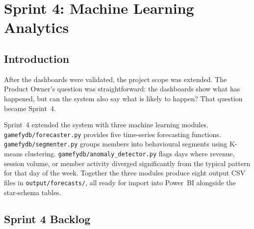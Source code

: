 \documentclass[12pt, a4paper]{report}
\begin{document}
\chapter{Sprint 4: Machine Learning Analytics}

\section{Introduction}

After the dashboards were validated, the project scope was extended. The Product
Owner's question was straightforward: the dashboards show what has happened, but can
the system also say what is likely to happen? That question became Sprint~4.

Sprint~4 extended the system with three machine learning modules.
\texttt{gamefydb/forecaster.py} provides five time-series forecasting functions.
\texttt{gamefydb/segmenter.py} groups members into behavioural segments using
K-means clustering. \texttt{gamefydb/anomaly\_detector.py} flags days where
revenue, session volume, or member activity diverged significantly from the
typical pattern for that day of the week. Together the three modules produce
eight output CSV files in \texttt{output/forecasts/}, all ready for import into
Power~BI alongside the star-schema tables.

\section{Sprint 4 Backlog}
\end{document}
